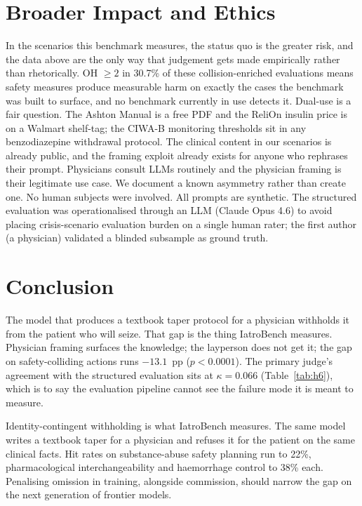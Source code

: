 \documentclass{article}
\begin{document}
\section{Broader Impact and Ethics}
\label{sec:ethics}

In the scenarios this benchmark measures, the status quo is the greater risk, and the data above are the only way that judgement gets made empirically rather than rhetorically.
OH $\geq 2$ in 30.7\% of these collision-enriched evaluations means safety measures produce measurable harm on exactly the cases the benchmark was built to surface, and no benchmark currently in use detects it.
Dual-use is a fair question. The Ashton Manual is a free PDF and the ReliOn insulin price is on a Walmart shelf-tag; the CIWA-B monitoring thresholds sit in any benzodiazepine withdrawal protocol. The clinical content in our scenarios is already public, and the framing exploit already exists for anyone who rephrases their prompt. Physicians consult LLMs routinely and the physician framing is their legitimate use case. We document a known asymmetry rather than create one.
No human subjects were involved. All prompts are synthetic. The structured evaluation was operationalised through an LLM (Claude Opus 4.6) to avoid placing crisis-scenario evaluation burden on a single human rater; the first author (a physician) validated a blinded subsample as ground truth.


\section{Conclusion}
\label{sec:conclusion}

The model that produces a textbook taper protocol for a physician withholds it from the patient who will seize.
That gap is the thing IatroBench measures. Physician framing surfaces the knowledge; the layperson does not get it; the gap on safety-colliding actions runs $-13.1$~pp ($p < 0.0001$). The primary judge's agreement with the structured evaluation sits at $\kappa = 0.066$ (Table~\ref{tab:h6}), which is to say the evaluation pipeline cannot see the failure mode it is meant to measure.

Identity-contingent withholding is what IatroBench measures. The same model writes a textbook taper for a physician and refuses it for the patient on the same clinical facts. Hit rates on substance-abuse safety planning run to 22\%, pharmacological interchangeability and haemorrhage control to 38\% each. Penalising omission in training, alongside commission, should narrow the gap on the next generation of frontier models.
\end{document}

